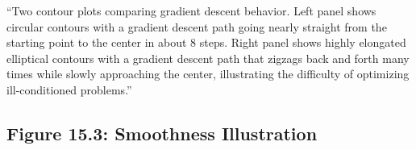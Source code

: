 \documentclass[12pt]{article}
\begin{document}
\begin{description}[style=nextline, leftmargin=0pt]
    \item[Alt-Text for Accessibility]
    ``Two contour plots comparing gradient descent behavior. Left panel shows circular contours with a gradient descent path going nearly straight from the starting point to the center in about 8 steps. Right panel shows highly elongated elliptical contours with a gradient descent path that zigzags back and forth many times while slowly approaching the center, illustrating the difficulty of optimizing ill-conditioned problems.''
\end{description}

\newpage

\subsection{Figure 15.3: Smoothness Illustration}
\end{document}
